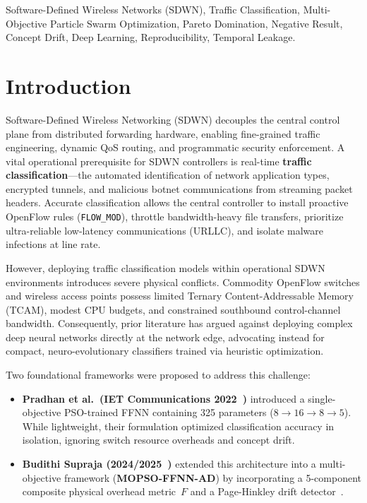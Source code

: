 \documentclass[journal]{IEEEtran}
\begin{document}
\begin{IEEEkeywords}
Software-Defined Wireless Networks (SDWN), Traffic Classification,
Multi-Objective Particle Swarm Optimization, Pareto Domination, Negative
Result, Concept Drift, Deep Learning, Reproducibility, Temporal Leakage.
\end{IEEEkeywords}

\section{Introduction}
\label{sec:intro}

Software-Defined Wireless Networking (SDWN) decouples the central control
plane from distributed forwarding hardware, enabling fine-grained traffic
engineering, dynamic QoS routing, and programmatic security enforcement. A
vital operational prerequisite for SDWN controllers is real-time
\textbf{traffic classification}---the automated identification of network
application types, encrypted tunnels, and malicious botnet communications from
streaming packet headers. Accurate classification allows the central controller
to install proactive OpenFlow rules (\texttt{FLOW\_MOD}), throttle
bandwidth-heavy file transfers, prioritize ultra-reliable low-latency
communications (URLLC), and isolate malware infections at line rate.

However, deploying traffic classification models within operational SDWN
environments introduces severe physical conflicts. Commodity OpenFlow switches
and wireless access points possess limited Ternary Content-Addressable Memory
(TCAM), modest CPU budgets, and constrained southbound control-channel
bandwidth. Consequently, prior literature has argued against deploying complex
deep neural networks directly at the network edge, advocating instead for
compact, neuro-evolutionary classifiers trained via heuristic optimization.

Two foundational frameworks were proposed to address this challenge:
\begin{itemize}
  \item \textbf{Pradhan et al.\ (IET Communications 2022~\cite{pradhan2022})}
    introduced a single-objective PSO-trained FFNN containing 325 parameters
    ($8{\to}16{\to}8{\to}5$). While lightweight, their formulation optimized
    classification accuracy in isolation, ignoring switch resource overheads
    and concept drift.
  \item \textbf{Budithi Supraja (2024/2025~\cite{supraja2024})} extended this
    architecture into a multi-objective framework (\textbf{MOPSO-FFNN-AD}) by
    incorporating a 5-component composite physical overhead metric~$F$ and a
    Page-Hinkley drift detector~\cite{page1954}.
\end{itemize}
\end{document}
